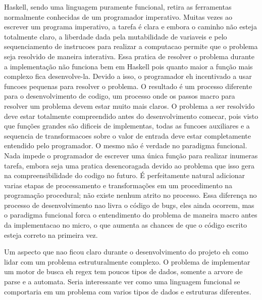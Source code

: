 Haskell, sendo uma linguagem puramente funcional, retira as ferramentas normalmente conhecidas de um programador imperativo.
Muitas vezes ao escrever um programa imperativo, a tarefa é clara e embora o caminho não esteja totalmente claro, a liberdade dada pela mutabilidade de variaveis e pelo sequenciamento de instrucoes para realizar a computacao permite que o problema seja resolvido de maneira interativa.
Essa pratica de resolver o problema durante a implementação não funciona bem em Haskell pois quanto maior a função mais complexo fica desenvolve-la.
Devido a isso, o programador eh incentivado a usar funcoes pequenas para resolver o problema.
O resultado é um processo diferente para o desenvolvimento de codigo, um processo onde os passos macro para resolver um problema devem estar muito mais claros.
O problema a ser resolvido deve estar totalmente compreendido antes do desenvolvimento comecar, pois visto que funções grandes são dificeis de implementas, todas as funcoes auxiliares e a sequencia de transformacoes sobre o valor de entrada deve estar completamente entendido pelo programador.
O mesmo não é verdade no paradigma funcional.
Nada impede o programador de escrever uma única função para realizar inumeras tarefa, embora seja uma pratica desencoragada devido ao problema que isso gera na compreensibilidade do codigo no futuro.
É perfeitamente natural adicionar varias etapas de processamento e transformações em um procedimento na programação procedural; não existe nenhum atrito no processo.
Essa diferença no processo de desenvolvimento nao livra o código de bugs, eles ainda ocorrem, mas o paradigma funcional forca o entendimento do problema de maneira macro antes da implementacao no micro, o que aumenta as chances de que o código escrito esteja correto na primeira vez.

Um aspecto que nao ficou claro durante o desenvolvimento do projeto eh como lidar com um problema estruturalmente complexo.
O problema de implementar um motor de busca eh regex tem poucos tipos de dados, somente a arvore de parse e a automata.
Seria interessante ver como uma linguagem funcional se comportaria em um problema com varios tipos de dados e estruturas diferentes.

